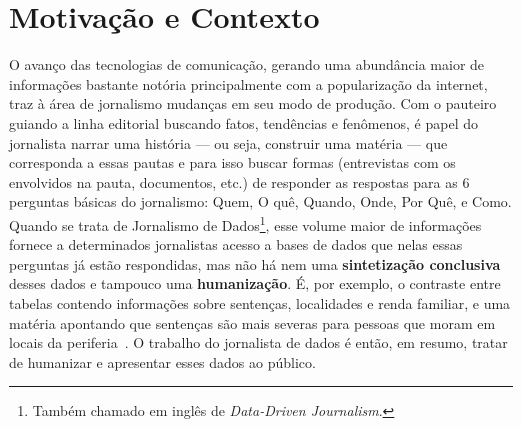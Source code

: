 \section{Motivação e Contexto~\label{sec:Motivação-e-Contexto}}


O avanço das tecnologias de comunicação, gerando uma abundância maior de
informações bastante notória principalmente com a popularização da internet,
traz à área de jornalismo mudanças em seu modo de produção. Com o pauteiro
guiando a linha editorial buscando fatos, tendências e fenômenos, é papel do
jornalista narrar uma história --- ou seja, construir uma matéria ---  que
corresponda a essas pautas e para isso buscar formas (entrevistas com os
envolvidos na pauta, documentos, etc.) de responder as respostas para as 6
perguntas básicas do jornalismo: Quem, O quê, Quando, Onde, Por Quê, e Como.
Quando se trata de Jornalismo de Dados\footnote{Também chamado em inglês de
\textit{Data-Driven Journalism}.}, esse volume maior de informações fornece a
determinados jornalistas acesso a bases de dados que nelas essas perguntas já
estão respondidas, mas não há nem uma \textbf{sintetização conclusiva} desses
dados e tampouco uma \textbf{humanização}. É, por exemplo, o contraste entre
tabelas contendo informações sobre sentenças, localidades e renda familiar, e
uma matéria apontando que sentenças são mais severas para pessoas que moram em
locais da periferia~\cite{news:sentenças-mais-severas-para-periferia}. O
trabalho do jornalista de dados é então, em resumo, tratar de humanizar e
apresentar esses dados ao público.



